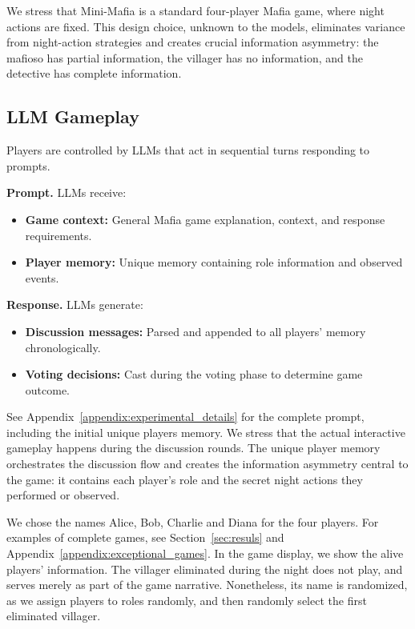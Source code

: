 \documentclass{article}
\begin{document}
We stress that Mini-Mafia is a standard four-player Mafia game, where night actions are fixed. This design choice, unknown to the models, eliminates variance from night-action strategies and creates crucial information asymmetry: the mafioso has partial information, the villager has no information, and the detective has complete information.

\subsection{LLM Gameplay}

Players are controlled by LLMs that act in sequential turns responding to prompts.

\textbf{Prompt.} LLMs receive:
  \begin{itemize}
    \item \textbf{Game context:} General Mafia game explanation, context, and response requirements.
    \item \textbf{Player memory:} Unique memory containing role information and observed events.
  \end{itemize}

\textbf{Response.} LLMs generate:
  \begin{itemize}
    \item \textbf{Discussion messages:} Parsed and appended to all players' memory chronologically.
    \item \textbf{Voting decisions:} Cast during the voting phase to determine game outcome.
  \end{itemize}
See Appendix~\ref{appendix:experimental_details} for the complete prompt, including the initial unique players memory. We stress that the actual interactive gameplay happens during the discussion rounds. The unique player memory orchestrates the discussion flow and creates the information asymmetry central to the game: it contains each player's role and the secret night actions they performed or observed. 

We chose the names Alice, Bob, Charlie and Diana for the four players. For examples of complete games, see Section~\ref{sec:resuls} and Appendix~\ref{appendix:exceptional_games}. In the game display, we show the alive players' information. The villager eliminated during the night does not play, and serves merely as part of the game narrative. Nonetheless, its name is randomized, as we assign players to roles randomly, and then randomly select the first eliminated villager.
\end{document}
